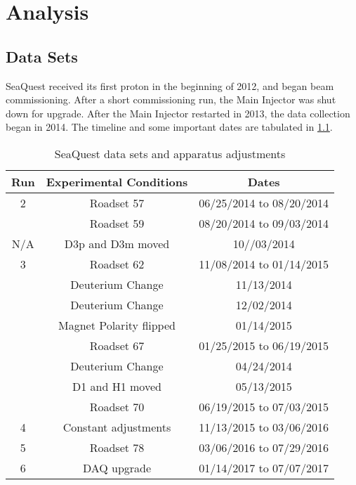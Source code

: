 \documentclass[../main.tex]{subfiles}
\begin{document}
\ifSubfilesClassLoaded{
	\mainmatter
	\setcounter{chapter}{4}
}{}

\chapter{Analysis}
\label{ch:analysis}

\section{Data Sets}
SeaQuest received its first proton in the beginning of 2012, and began beam
commissioning. After a short commissioning run, the Main Injector was shut down for
upgrade. After the Main Injector restarted in 2013, the data collection began in
2014. The timeline and some important dates are tabulated in \cref{tab:dataset}.
\begin{table}[h!]
	\centering
	\begin{tabular}{ c c c }
		\hline
		Run & Experimental Conditions & Dates                    \\
		\hline
		2   & Roadset 57              & 06/25/2014 to 08/20/2014 \\
		    & Roadset 59              & 08/20/2014 to 09/03/2014 \\
		\hline
		N/A & D3p and D3m moved       & 10//03/2014              \\
		\hline
		3   & Roadset 62              & 11/08/2014 to 01/14/2015 \\
		    & Deuterium Change        & 11/13/2014               \\
		    & Deuterium Change        & 12/02/2014               \\
		    & Magnet Polarity flipped & 01/14/2015               \\
		    & Roadset 67              & 01/25/2015 to 06/19/2015 \\
		    & Deuterium Change        & 04/24/2014               \\
		    & D1 and H1 moved         & 05/13/2015               \\
		    & Roadset 70              & 06/19/2015 to 07/03/2015 \\
		\hline
		4   & Constant adjustments    & 11/13/2015 to 03/06/2016 \\
		5   & Roadset 78              & 03/06/2016 to 07/29/2016 \\
		6   & DAQ upgrade             & 01/14/2017 to 07/07/2017 \\ \hline
	\end{tabular}
	\caption{SeaQuest data sets and apparatus adjustments}
	\label{tab:dataset}
\end{table}
\end{document}

